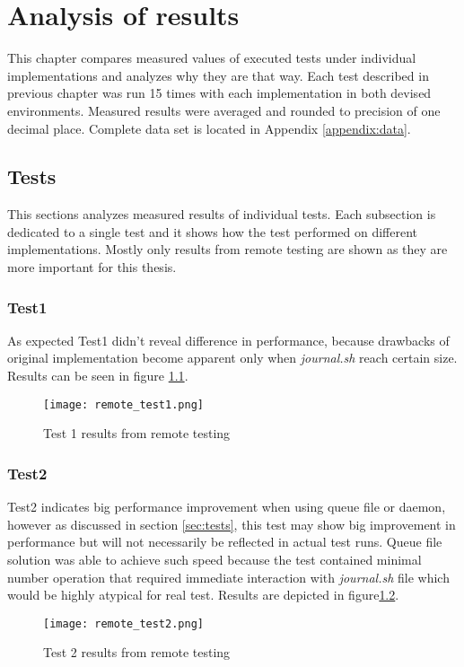 \chapter{Analysis of results}
\label{results}
This chapter compares measured values of executed tests under individual implementations and analyzes why they are that way.
Each test described in previous chapter was run 15 times with each implementation in both devised environments. Measured results were averaged and rounded to precision of one decimal place. Complete data set is located in Appendix \ref{appendix:data}.

\section{Tests}
This sections analyzes measured results of individual tests. Each subsection is dedicated to a single test and it shows how the test performed on different implementations. Mostly only results from remote testing are shown as they are more important for this thesis.


\subsection{Test1}
As expected Test1 didn't reveal difference in performance, because drawbacks of original implementation become apparent only when \textit{journal.sh} reach certain size. Results can be seen in figure \ref{fig:remote_test1}.

\begin{figure}
  \texttt{[image: remote\_test1.png]}
  \caption{Test 1 results from remote testing}
  \label{fig:remote_test1}
\end{figure}

\subsection{Test2}
Test2 indicates big performance improvement when using queue file or daemon, however as discussed in section \ref{sec:tests}, this test may show big improvement in performance but will not necessarily be reflected in actual test runs. Queue file solution was able to achieve such speed because  the test contained minimal number operation that required immediate interaction with \textit{journal.sh} file which would be highly atypical for real test. Results are depicted in figure\ref{fig:remote_test2}.

\begin{figure}
  \texttt{[image: remote\_test2.png]}
  \caption{Test 2 results from remote testing}
  \label{fig:remote_test2}
\end{figure}

